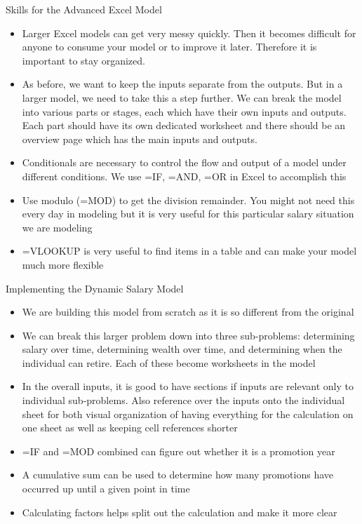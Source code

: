 \documentclass[]{article}
\begin{document}
\begin{section}{Skills for the Advanced Excel Model}
\begin{itemize}
\item Larger Excel models can get very messy quickly. Then it becomes difficult for anyone to consume your model or to improve it later. Therefore it is important to stay organized.
\item As before, we want to keep the inputs separate from the outputs. But in a larger model, we need to take this a step further. We can break the model into various parts or stages, each which have their own inputs and outputs. Each part should have its own dedicated worksheet and there should be an overview page which has the main inputs and outputs.
\item Conditionals are necessary to control the flow and output of a model under different conditions. We use =IF, =AND, =OR in Excel to accomplish this
\item Use modulo (=MOD) to get the division remainder. You might not need this every day in modeling but it is very useful for this particular salary situation we are modeling
\item =VLOOKUP is very useful to find items in a table and can make your model much more flexible
\end{itemize}
\end{section}
\begin{section}{Implementing the Dynamic Salary Model}
\begin{itemize}
\item We are building this model from scratch as it is so different from the original
\item We can break this larger problem down into three sub-problems: determining salary over time, determining wealth over time, and determining when the individual can retire. Each of these become worksheets in the model
\item In the overall inputs, it is good to have sections if inputs are relevant only to individual sub-problems. Also reference over the inputs onto the individual sheet for both visual organization of having everything for the calculation on one sheet as well as keeping cell references shorter
\item =IF and =MOD combined can figure out whether it is a promotion year
\item A cumulative sum can be used to determine how many promotions have occurred up until a given point in time
\item Calculating factors helps split out the calculation and make it more clear
\end{itemize}
\end{section}
\end{document}

